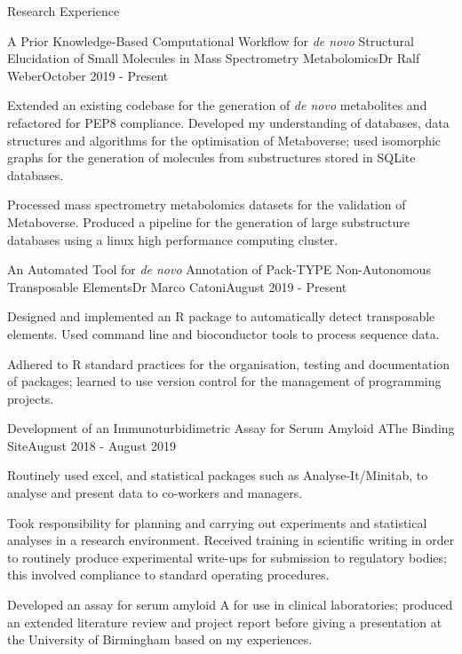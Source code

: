 \documentclass{resume}
\begin{document}
\begin{rSection}{Research Experience}

\begin{rSubsection}{A Prior Knowledge-Based Computational Workflow for \textit{de novo} Structural Elucidation of Small Molecules in Mass Spectrometry Metabolomics}{}{Dr Ralf Weber}{October 2019 - Present}
\item Extended an existing codebase for the generation of \textit{de novo} metabolites and refactored for PEP8 compliance. Developed my understanding of databases, data structures and algorithms for the optimisation of Metaboverse; used isomorphic graphs for the generation of molecules from substructures stored in SQLite databases.
\item Processed mass spectrometry metabolomics datasets for the validation of Metaboverse. Produced a pipeline for the generation of large substructure databases using a linux high performance computing cluster. 
\end{rSubsection}

\begin{rSubsection}{An Automated Tool for \textit{de novo} Annotation of Pack-TYPE Non-Autonomous Transposable Elements}{}{Dr Marco Catoni}{August 2019 - Present}
\item Designed and implemented an R package to automatically detect transposable elements. Used command line and bioconductor tools to process sequence data. 
\item Adhered to R standard practices for the organisation, testing and documentation of packages; learned to use version control for the management of programming projects. 
\end{rSubsection}

\begin{rSubsection}{Development of an Immunoturbidimetric Assay for Serum Amyloid A}{}{The Binding Site}{August 2018 - August 2019}
\item Routinely used excel, and statistical packages such as Analyse-It/Minitab, to analyse and present data to co-workers and managers. 
\item Took responsibility for planning and carrying out experiments and statistical analyses in a research environment. Received training in scientific writing in order to routinely produce experimental write-ups for submission to regulatory bodies; this involved compliance to standard operating procedures.
\item Developed an assay for serum amyloid A for use in clinical laboratories; produced an extended literature review and project report before giving a presentation at the University of Birmingham based on my experiences. 
\end{rSubsection}

\end{rSection}
\end{document}
